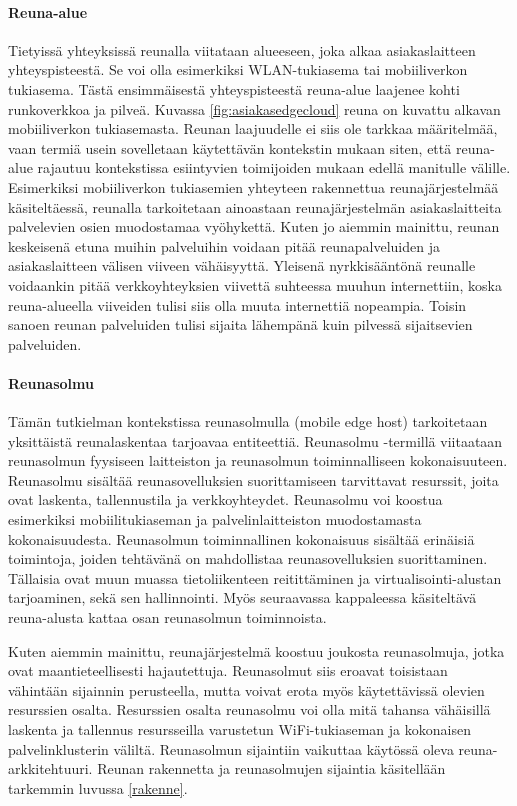 \paragraph{Reuna-alue} 
Tietyissä yhteyksissä reunalla viitataan alueeseen, joka alkaa asiakaslaitteen yhteyspisteestä. Se voi olla esimerkiksi WLAN-tukiasema tai mobiiliverkon tukiasema. Tästä ensimmäisestä yhteyspisteestä reuna-alue laajenee kohti runkoverkkoa ja pilveä.
Kuvassa \ref{fig:asiakasedgecloud} reuna on kuvattu alkavan mobiiliverkon tukiasemasta.
Reunan laajuudelle ei siis ole tarkkaa määritelmää, vaan termiä usein sovelletaan käytettävän kontekstin mukaan siten, että reuna-alue rajautuu kontekstissa esiintyvien toimijoiden mukaan edellä manitulle välille.
Esimerkiksi mobiiliverkon tukiasemien yhteyteen rakennettua reunajärjestelmää käsiteltäessä, reunalla tarkoitetaan ainoastaan reunajärjestelmän asiakaslaitteita palvelevien osien muodostamaa vyöhykettä. 
Kuten jo aiemmin mainittu, reunan keskeisenä etuna muihin palveluihin voidaan pitää reunapalveluiden ja asiakaslaitteen välisen viiveen vähäisyyttä.
Yleisenä nyrkkisääntönä reunalle voidaankin pitää verkkoyhteyksien viivettä suhteessa muuhun internettiin, koska reuna-alueella viiveiden tulisi siis olla muuta internettiä nopeampia. Toisin sanoen reunan palveluiden tulisi sijaita lähempänä kuin pilvessä sijaitsevien palveluiden.


\paragraph{Reunasolmu} 
Tämän tutkielman kontekstissa reunasolmulla (mobile edge host) tarkoitetaan yksittäistä reunalaskentaa tarjoavaa entiteettiä\cite{etsirefarch}.
Reunasolmu -termillä viitaataan reunasolmun fyysiseen laitteiston ja reunasolmun toiminnalliseen kokonaisuuteen.
Reunasolmu sisältää reunasovelluksien suorittamiseen tarvittavat resurssit, joita ovat laskenta, tallennustila ja verkkoyhteydet.
Reunasolmu voi koostua esimerkiksi mobiilitukiaseman ja palvelinlaitteiston muodostamasta kokonaisuudesta. 
Reunasolmun toiminnallinen kokonaisuus sisältää erinäisiä toimintoja, joiden tehtävänä on mahdollistaa reunasovelluksien suorittaminen. Tällaisia ovat muun muassa tietoliikenteen reitittäminen ja virtualisointi-alustan tarjoaminen, sekä sen hallinnointi. Myös seuraavassa kappaleessa käsiteltävä reuna-alusta kattaa osan reunasolmun toiminnoista.

Kuten aiemmin mainittu, reunajärjestelmä koostuu joukosta reunasolmuja, jotka ovat maantieteellisesti hajautettuja.
Reunasolmut siis eroavat toisistaan vähintään sijainnin perusteella, mutta voivat erota myös käytettävissä olevien resurssien osalta. Resurssien osalta reunasolmu voi olla mitä tahansa vähäisillä laskenta ja tallennus resursseilla varustetun WiFi-tukiaseman ja kokonaisen palvelinklusterin väliltä.
Reunasolmun sijaintiin vaikuttaa käytössä oleva reuna-arkkitehtuuri.
Reunan rakennetta ja  reunasolmujen sijaintia käsitellään tarkemmin luvussa \ref{rakenne}.

